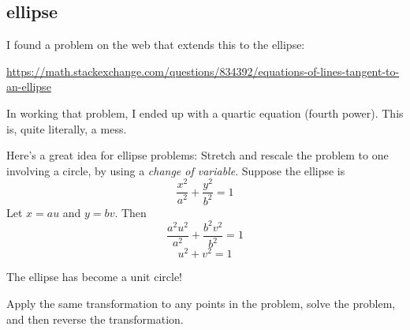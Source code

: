 \documentclass[11pt, oneside]{article}
\begin{document}
\subsection*{ellipse}
I found a problem on the web that extends this to the ellipse:

\url{https://math.stackexchange.com/questions/834392/equations-of-lines-tangent-to-an-ellipse}

In working that problem, I ended up with a quartic equation (fourth power).  This is, quite literally, a mess.

Here's a great idea for ellipse problems:  Stretch and rescale the problem to one involving a circle, by using a \emph{change of variable}.  Suppose the ellipse is
\[ \frac{x^2}{a^2} + \frac{y^2}{b^2} = 1 \]
Let $x = au$ and $y = bv$.  Then
\[ \frac{a^2u^2}{a^2} + \frac{b^2 v^2}{b^2} = 1 \]
\[ u^2 + v^2 = 1 \]

The ellipse has become a unit circle!

Apply the same transformation to any points in the problem, solve the problem, and then reverse the transformation.
\end{document}
